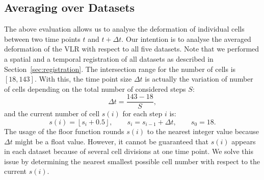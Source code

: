 \documentclass[11pt,a4paper, final]{article}
\begin{document}
\subsection{Averaging over Datasets}
\noindent
The above evaluation allows us to analyse the deformation of individual cells between two time points $t$ and $t + \Delta t$. Our intention is to analyse the averaged deformation of the VLR with respect to all five datasets. Note that we performed a spatial and a temporal registration of all datasets as described in Section~\ref{sec:registration}. The intersection range for the number of cells is $[18, 143]$. With this, the time point size $\Delta t$ is actually the variation of number of cells depending on the total number of considered steps $S$:
\begin{equation}
\Delta t = \frac{143 - 18}{S},
\end{equation}
and the current number of cell $s(i)$ for each step $i$ is:
\begin{equation}
s(i) = \left\lfloor s_i + 0.5 \right\rfloor, \qquad s_i = s_{i-1} + \Delta t, \qquad s_0 = 18.
\end{equation}
The usage of the floor function rounds $s(i)$ to the nearest integer value because $\Delta t$ might be a float value. However, it cannot be guaranteed that $s(i)$ appears in each dataset because of several cell divisions at one time point. We solve this issue by determining the nearest smallest possible cell number with respect to the current $s(i)$.
\end{document}
